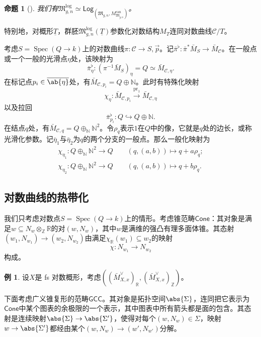 \documentclass{amsart}
\newtheorem{prop}[thm]{命题}
\theoremstyle{definition}
\newtheorem{exm}[thm]{例}
\theoremstyle{remark}
\theoremstyle{plain}
\theoremstyle{definition}
\theoremstyle{remark}
\newcommand{\N}{\mathbb{N}}
\newcommand{\R}{\mathbb{R}}
\newcommand{\Z}{\mathbb{Z}}
\newcommand{\mc}[1]{\mathcal{#1}}
\newcommand{\mf}[1]{\mathfrak{#1}}
\newcommand{\on}[1]{\operatorname{#1}}
\newcommand{\ms}[1]{\mathsf{#1}}
\newcommand{\ol}[1]{\overline{#1}}
\newcommand{\ul}[1]{\underline{#1}}
\newcommand{\1}{\mathbf{1}}
\newcommand{\2}{\mathbf{2}}
\newcommand{\3}{\mathbf{3}}
\DeclareMathOperator{\Spec}{Spec}
\begin{document}
\begin{prop}[{\cite{FKato2000,Olsson2003}}]
    我们有\(\mf{M}_{g,n}^{\log} \simeq \ms{Log}_{(\mf{M}_{g,n}, M_{\mf{M}_{g,n}}^{\on{can}})}\)。
\end{prop}

特别地，对概形\(\ul{T}\)，群胚\(\mf{M}_{g,n}^{\log}(\ul{T})\)参数化对数结构\(M_T\)连同对数曲线\(\mc{C} / T\)。

考虑\(S = \Spec (Q \to k)\)上的对数曲线\(\pi \colon \mc{C} \to S, \vec{p}\)。记\(\bar{\pi}^{\flat} \colon \bar{\pi}^* \bar{M}_S \to \bar{M}_{\mc{C}}\)。在一般点或一个一般的光滑点\(\eta\)处，该映射为
\[ \bar{\pi}_{\eta}^{\flat} \colon (\pi^{-1} \bar{M}_S)_{\eta} = Q \simeq \bar{M}_{\mc{C}, \eta}. \]
在标记点\(p_i \in \ol{\ab\{\eta\}}\)处，有\(\bar{M}_{\mc{C}, p_i} = Q \oplus \N\)。此时有特殊化映射
\[ \chi_{\eta} \colon \bar{M}_{\mc{C}, p_i} \xrightarrow{\on{pr}_1} \bar{M}_{\mc{C}, \eta} \]
以及拉回
\[ \bar{\pi}_{p_i}^{\flat} \colon Q \hookrightarrow Q \oplus \N. \]
在结点\(q\)处，有\(\bar{M}_{\mc{C}, q} = Q \oplus_{\N} \N^2\)。令\(\rho_q\)表示\(1\)在\(Q\)中的像，它就是\(q\)处的边长，或称光滑化参数。记\(\bar{\eta}_1\)与\(\bar{\eta}_2\)为\(q\)的两个分支的一般点。那么一般化映射为
\begin{align*}
    \chi_{\eta_1} \colon Q \oplus_{\N} \N^2 \to Q \qquad (q, (a,b)) \mapsto q + a \rho_q ;\\
    \chi_{\eta_2} \colon Q \oplus_{\N} \N^2 \to Q \qquad (q, (a,b)) \mapsto q + b \rho_q .
\end{align*}

\subsection{对数曲线的热带化}%
\label{sub:Tropicalization of log curves}

我们只考虑对数点\(S = \Spec(Q \to k)\)上的情形。考虑锥范畴\(\ms{Cone}\)：其对象是满足\(w \subseteq N_w \otimes_{\Z} \R\)的对\((w, N_w)\)，其中\(w\)是满维的强凸有理多面体锥。其态射\((w_1, N_{w_1}) \to (w_2, N_{w_2})\)由满足\(\chi_{\R}(w_1) \subseteq w_2\)的映射
\[ \chi \colon N_{w_1} \to N_{w_2} \]
构成。

\begin{exm}
    设\(X\)是 fs 对数概形，考虑\(( (\bar{M}_{X,x}^{\vee})_{\R}, (\bar{M}_{X,x}^{\vee})_{\Z} )\)。
\end{exm}

下面考虑广义锥复形的范畴\(\ms{GCC}\)。其对象是拓扑空间\(\abs{\Sigma}\)，连同把它表示为\(\ms{Cone}\)中某个图表的余极限的一个表示，其中图表中所有箭头都是面的包含。其态射是连续映射\(\abs{\Sigma} \to \abs{\Sigma'}\)，使得对每个\((w, N_w) \in \Sigma\)，映射\(w \to \abs{\Sigma'}\)都经由某个\((w, N_w) \to (w', N_{w'})\)分解。
\end{document}
